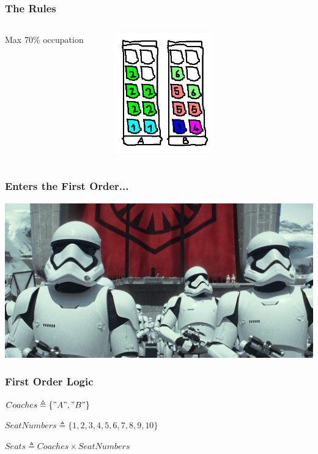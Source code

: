 \documentclass{beamer}
\begin{document}
\begin{frame}
  \frametitle{The Rules}
  \begin{columns}
    \begin{column}{0.5\textwidth}
      Max 70\% occupation
    \end{column}
    \begin{column}{0.5\textwidth}
      \begin{center}
        \includegraphics[width=0.5\textwidth]{tla-introduction/compliant-train}
      \end{center}
    \end{column}
  \end{columns}
\end{frame}

\begin{frame}
  \frametitle{Enters the First Order...}
  \begin{center}
    \includegraphics[width = 1\textwidth]{tla-introduction/first-order}
  \end{center}
\end{frame}

\begin{frame}
  \frametitle{First Order Logic}
  $Coaches \triangleq \{"A", "B"\}$

  $SeatNumbers \triangleq \{1, 2, 3, 4, 5, 6, 7, 8, 9, 10\}$

  $Seats \triangleq Coaches \times SeatNumbers$
\end{frame}
\end{document}
